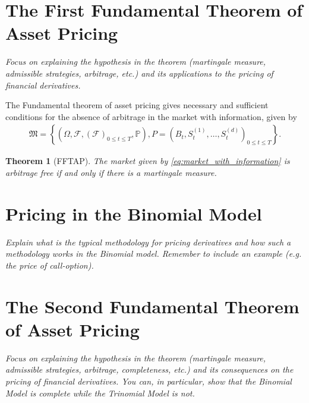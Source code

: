 \documentclass{article}
\newtheorem{theorem}{Theorem}[section]
\theoremstyle{definition}
\numberwithin{equation}{section}
\begin{document}
\newpage

\section{The First Fundamental Theorem of Asset Pricing}
\textit{Focus on explaining the hypothesis in the theorem (martingale measure, admissible strategies, arbitrage, etc.) and its applications to the pricing of financial derivatives.}

The Fundamental theorem of asset pricing gives necessary and sufficient conditions for the absence of arbitrage in the market with information, given by
\begin{align}\label{eq:market_with_information}
    \mathfrak{M} =
    \left\{
        \left(
            \Omega, 
            \mathscr{F}, 
            \left(
                \mathscr{F}
            \right)_{0 \leq t \leq T},
            \mathbb{P}
        \right),
        P =
        \left(
            B_t,
            S_t^{(1)},
            \ldots,
            S_t^{(d)}
        \right)_{0 \leq t \leq T}
    \right\}.
\end{align}

\begin{theorem}[FFTAP]
    The market given by \eqref{eq:market_with_information} is arbitrage free if and only if there is a martingale measure. 
\end{theorem}

\newpage

\section{Pricing in the Binomial Model}
\textit{Explain what is the typical methodology for pricing derivatives and how such a methodology works in the Binomial model. Remember to include an example (e.g. the price of call-option).}

\newpage

\section{The Second Fundamental Theorem of Asset Pricing}
\textit{Focus on explaining the hypothesis in the theorem (martingale measure, admissible strategies, arbitrage, completeness, etc.) and its consequences on the pricing of financial derivatives. You can, in particular, show that the Binomial Model is complete while the Trinomial Model is not.}
\end{document}
